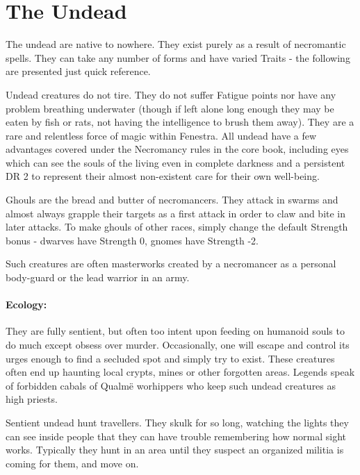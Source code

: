 \section{The Undead}

\begin{multicols}{2}

The undead are native to nowhere.  They exist purely as a result of necromantic spells.  They can take any number of forms and have varied Traits - the following are presented just quick reference.

Undead creatures do not tire.  They do not suffer Fatigue points nor have any problem breathing underwater (though if left alone long enough they may be eaten by fish or rats, not having the intelligence to brush them away).  They are a rare and relentless force of magic within Fenestra.  All undead have a few advantages covered under the Necromancy rules in the core book, including eyes which can see the souls of the living even in complete darkness and a persistent DR 2 to represent their almost non-existent care for their own well-being.

\label{ghoul}
\ghoul

Ghouls are the bread and butter of necromancers.  They attack in swarms and almost always grapple their targets as a first attack in order to claw and bite in later attacks.  To make ghouls of other races, simply change the default Strength bonus - dwarves have Strength 0, gnomes have Strength -2.

\label{ghast}


Such creatures are often masterworks created by a necromancer as a personal body-guard or the lead warrior in an army.

\ghast

\paragraph{Ecology:} They are fully sentient, but often too intent upon feeding on humanoid souls to do much except obsess over murder.  Occasionally, one will escape and control its urges enough to find a secluded spot and simply try to exist.  These creatures often end up haunting local crypts, mines or other forgotten areas.  Legends speak of forbidden cabals of Qualm\"{e} worhippers who keep such undead creatures as high priests.

Sentient undead hunt travellers.  They skulk for so long, watching the lights they can see inside people that they can have trouble remembering how normal sight works.  Typically they hunt in an area until they suspect an organized militia is coming for them, and move on.


\end{multicols}
